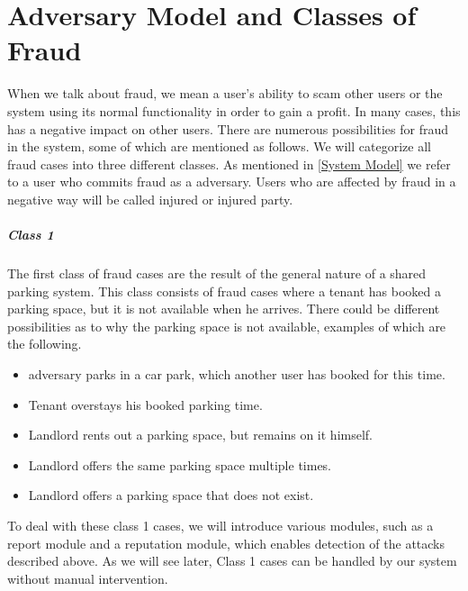 \section{Adversary Model and Classes of Fraud}
When we talk about fraud, we mean a user's ability to scam other users or the system using its normal functionality in order to gain a profit. In many cases, this has a negative impact on other users. There are numerous possibilities for fraud in the system, some of which are mentioned as follows. We will categorize all fraud cases into three different classes. As mentioned in \ref{System Model} we refer to a user who commits fraud as a adversary. Users who are affected by fraud in a negative way will be called injured or injured party. \\

\subparagraph{Class 1} The first class of fraud cases are the result of the general nature of a shared parking system. This class consists of fraud cases where a tenant has booked a parking space, but it is not available when he arrives. There could be different possibilities as to why the parking space is not available, examples of which are the following.
\begin{itemize}
\item adversary parks in a car park, which another user has booked for this time.
\item Tenant overstays his booked parking time.
\item Landlord rents out a parking space, but remains on it himself.
\item Landlord offers the same parking space multiple times.
\item Landlord offers a parking space that does not exist.
\end{itemize}
To deal with these class 1 cases, we will introduce various modules, such as a report module and a reputation module, which enables detection of the attacks described above. As we will see later, Class 1 cases can be handled by our system without manual intervention. 

